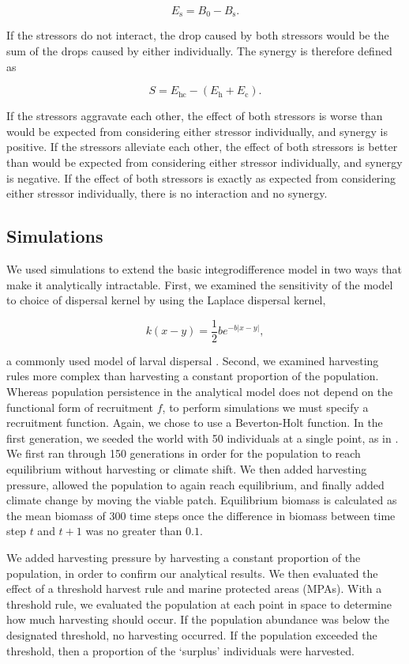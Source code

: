 \documentclass[12pt,english]{article}
\begin{document}
\begin{spacing}{1.9}
\begin{flushleft}
\[E_\text{s}=B_0-B_\text{s}.\]

\noindent If the stressors do not interact, the drop caused by both stressors would be the sum of the drops caused by 
either individually. The synergy is therefore defined as

\[S = E_\text{hc}-\left(E_\text{h}+E_\text{c}\right).\]

\noindent If the stressors aggravate each other, the effect of both stressors is worse than would be expected from 
considering either stressor individually, and synergy is positive. If the stressors alleviate each other, the effect 
of both stressors is better than would be expected from considering either stressor individually, and synergy is 
negative. If the effect of both stressors is exactly as expected from considering either stressor individually, 
there is no interaction and no synergy.

\subsection{Simulations }

We used simulations to extend the basic integrodifference model in two ways that make it analytically 
intractable. First, we examined the sensitivity of the model to choice of dispersal kernel by using the Laplace 
dispersal kernel, 

\[ k(x-y)=\frac{1}{2}be^{-b|x-y|},\]

\noindent a commonly used model of larval dispersal \citep{Pinsky:2011fk}.  Second, we examined harvesting rules more complex than harvesting a constant proportion of the population. Whereas population persistence in the analytical model does not depend on the functional form of recruitment $f$, to perform simulations we must 
specify a recruitment function.  Again, we chose to use a Beverton-Holt function.  In the first generation, we seeded the world with 50 individuals at a single point, as in \citep{ZhouKot2011}. We first ran through 150 generations in order for the population to reach equilibrium without harvesting or climate shift.  We then added harvesting pressure, allowed the population to again reach equilibrium, and finally added climate change by moving the viable patch.  Equilibrium biomass is calculated as the mean biomass of 300 time steps once the difference in biomass between time step $t$ and $t+1$ was no greater than $0.1$.  

We added harvesting pressure by harvesting a constant proportion of the population, in order to confirm our analytical results. We then evaluated the effect of a threshold harvest rule and marine protected 
areas (MPAs).  With a threshold rule, we evaluated the population at each point in space to determine how 
much harvesting should occur. If the population abundance was below the designated threshold, no 
harvesting occurred. If the population exceeded the threshold, then a proportion of the `surplus' individuals 
were harvested.


\end{flushleft}
\end{spacing}
\end{document}
